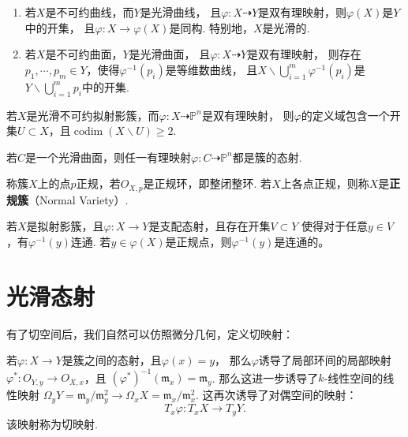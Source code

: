     \begin{corollary}
        \begin{enumerate}
            \item[(1)] 若$X$是不可约曲线，而$Y$是光滑曲线，
                       且$\varphi\colon X \dashrightarrow Y$是双有理映射，则$\varphi(X)$是$Y$中的开集，
                       且$\varphi\colon X \rightarrow \varphi(X)$是同构. 特别地，$X$是光滑的.
            \item[(2)] 若$X$是不可约曲面，$Y$是光滑曲面，
                       且$\varphi\colon X \dashrightarrow Y$是双有理映射，
                       则存在$p_{1},\cdots,p_{m} \in Y$，使得$\varphi^{-1}(p_{i})$是等维数曲线，
                       且$X \backslash \bigcup_{i=1}^{m}\varphi^{-1}(p_{i})$是
                       $Y \backslash \bigcup_{i=1}^{m}p_{i}$中的开集.
        \end{enumerate}
    \end{corollary}

    \begin{corollary}
        若$X$是光滑不可约拟射影簇，而$\varphi\colon X \dashrightarrow \mathbb{P}^{n}$是双有理映射，
        则$\varphi$的定义域包含一个开集$U \subset X$，且$\operatorname{codim}(X \backslash U) \geq 2$.
    \end{corollary}

    \begin{corollary}
        若$C$是一个光滑曲面，则任一有理映射$\varphi\colon C \dashrightarrow \mathbb{P}^{n}$都是簇的态射.
    \end{corollary}

    \begin{definition}
        称簇$X$上的点$p$正规，若$O_{X,p}$是正规环，即整闭整环. 
        若$X$上各点正规，则称$X$是\textbf{正规簇}（Normal Variety）.
    \end{definition}

    \begin{theorem}
        若$X$是拟射影簇，且$\varphi\colon X \rightarrow Y$是支配态射，且存在开集$V \subset Y$
        使得对于任意$y \in V$，有$\varphi^{-1}(y)$连通. 
        若$y \in \varphi(X)$是正规点，则$\varphi^{-1}(y)$是连通的。
    \end{theorem}


\section{光滑态射}
    有了切空间后，我们自然可以仿照微分几何，定义切映射：
    \begin{definition}
        若$\varphi\colon X \rightarrow Y$是簇之间的态射，且$\varphi(x)=y$，
        那么$\varphi$诱导了局部环间的局部映射
        $\varphi^{*}\colon O_{Y,y} \rightarrow O_{X,x}$，且
        $(\varphi^{*})^{-1}(\mathfrak{m}_{x})=\mathfrak{m}_{y}$.
        那么这进一步诱导了$k$-线性空间的线性映射
        $\Omega_{y}Y=\mathfrak{m}_{y}/\mathfrak{m}_{y}^{2}
        \rightarrow \Omega_{x}X=\mathfrak{m}_{x}/\mathfrak{m}_{x}^{2}$.
        这再次诱导了对偶空间的映射：
        \[ T_{x}\varphi\colon T_{x}X \rightarrow T_{y}Y.\]
        该映射称为切映射.
    \end{definition}

